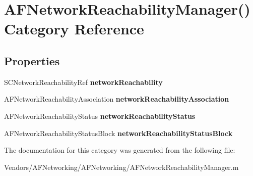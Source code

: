 \hypertarget{category_a_f_network_reachability_manager_07_08}{}\section{A\+F\+Network\+Reachability\+Manager() Category Reference}
\label{category_a_f_network_reachability_manager_07_08}
\subsection*{Properties}
\begin{DoxyCompactItemize}
\item 
\hypertarget{category_a_f_network_reachability_manager_07_08_a0f0b4881fa970faf96d588c7817338cc}{}S\+C\+Network\+Reachability\+Ref {\bfseries network\+Reachability}\label{category_a_f_network_reachability_manager_07_08_a0f0b4881fa970faf96d588c7817338cc}

\item 
\hypertarget{category_a_f_network_reachability_manager_07_08_a7faf34e28d1354f5c6fad30b2c3a7441}{}A\+F\+Network\+Reachability\+Association {\bfseries network\+Reachability\+Association}\label{category_a_f_network_reachability_manager_07_08_a7faf34e28d1354f5c6fad30b2c3a7441}

\item 
\hypertarget{category_a_f_network_reachability_manager_07_08_a95333765597b19f05573130cba7ad448}{}A\+F\+Network\+Reachability\+Status {\bfseries network\+Reachability\+Status}\label{category_a_f_network_reachability_manager_07_08_a95333765597b19f05573130cba7ad448}

\item 
\hypertarget{category_a_f_network_reachability_manager_07_08_a24af2821469a0c59e75544187a238502}{}A\+F\+Network\+Reachability\+Status\+Block {\bfseries network\+Reachability\+Status\+Block}\label{category_a_f_network_reachability_manager_07_08_a24af2821469a0c59e75544187a238502}

\end{DoxyCompactItemize}


The documentation for this category was generated from the following file\+:\begin{DoxyCompactItemize}
\item 
Vendors/\+A\+F\+Networking/\+A\+F\+Networking/A\+F\+Network\+Reachability\+Manager.\+m\end{DoxyCompactItemize}
